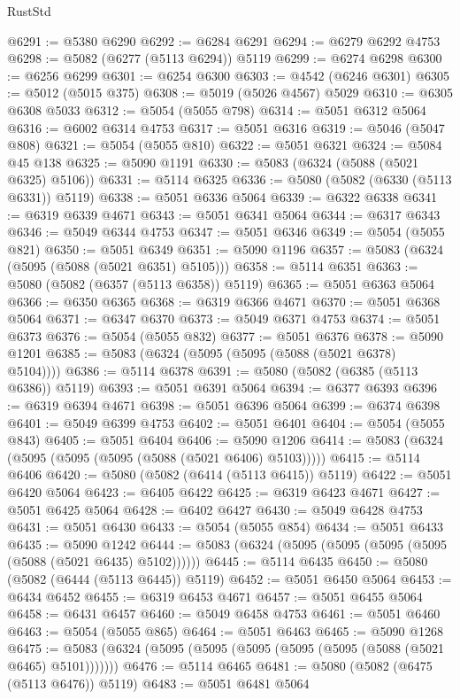 \begin{lexlean}{RustStd}
\begin{coremodule}
@6291 := @5380 @6290
@6292 := @6284 @6291
@6294 := @6279 @6292 @4753
@6298 := @5082 (@6277 (@5113 @6294)) @5119
@6299 := @6274 @6298
@6300 := @6256 @6299
@6301 := @6254 @6300
@6303 := @4542 (@6246 @6301)
@6305 := @5012 (@5015 @375)
@6308 := @5019 (@5026 @4567) @5029
@6310 := @6305 @6308 @5033
@6312 := @5054 (@5055 @798)
@6314 := @5051 @6312 @5064
@6316 := @6002 @6314 @4753
@6317 := @5051 @6316
@6319 := @5046 (@5047 @808)
@6321 := @5054 (@5055 @810)
@6322 := @5051 @6321
@6324 := @5084 @45 @138
@6325 := @5090 @1191
@6330 := @5083 (@6324 (@5088 (@5021 @6325) @5106))
@6331 := @5114 @6325
@6336 := @5080 (@5082 (@6330 (@5113 @6331)) @5119)
@6338 := @5051 @6336 @5064
@6339 := @6322 @6338
@6341 := @6319 @6339 @4671
@6343 := @5051 @6341 @5064
@6344 := @6317 @6343
@6346 := @5049 @6344 @4753
@6347 := @5051 @6346
@6349 := @5054 (@5055 @821)
@6350 := @5051 @6349
@6351 := @5090 @1196
@6357 := @5083 (@6324 (@5095 (@5088 (@5021 @6351) @5105)))
@6358 := @5114 @6351
@6363 := @5080 (@5082 (@6357 (@5113 @6358)) @5119)
@6365 := @5051 @6363 @5064
@6366 := @6350 @6365
@6368 := @6319 @6366 @4671
@6370 := @5051 @6368 @5064
@6371 := @6347 @6370
@6373 := @5049 @6371 @4753
@6374 := @5051 @6373
@6376 := @5054 (@5055 @832)
@6377 := @5051 @6376
@6378 := @5090 @1201
@6385 := @5083 (@6324 (@5095 (@5095 (@5088 (@5021 @6378) @5104))))
@6386 := @5114 @6378
@6391 := @5080 (@5082 (@6385 (@5113 @6386)) @5119)
@6393 := @5051 @6391 @5064
@6394 := @6377 @6393
@6396 := @6319 @6394 @4671
@6398 := @5051 @6396 @5064
@6399 := @6374 @6398
@6401 := @5049 @6399 @4753
@6402 := @5051 @6401
@6404 := @5054 (@5055 @843)
@6405 := @5051 @6404
@6406 := @5090 @1206
@6414 := @5083 (@6324 (@5095 (@5095 (@5095 (@5088 (@5021 @6406) @5103)))))
@6415 := @5114 @6406
@6420 := @5080 (@5082 (@6414 (@5113 @6415)) @5119)
@6422 := @5051 @6420 @5064
@6423 := @6405 @6422
@6425 := @6319 @6423 @4671
@6427 := @5051 @6425 @5064
@6428 := @6402 @6427
@6430 := @5049 @6428 @4753
@6431 := @5051 @6430
@6433 := @5054 (@5055 @854)
@6434 := @5051 @6433
@6435 := @5090 @1242
@6444 := @5083 (@6324 (@5095 (@5095 (@5095 (@5095 (@5088 (@5021 @6435) @5102))))))
@6445 := @5114 @6435
@6450 := @5080 (@5082 (@6444 (@5113 @6445)) @5119)
@6452 := @5051 @6450 @5064
@6453 := @6434 @6452
@6455 := @6319 @6453 @4671
@6457 := @5051 @6455 @5064
@6458 := @6431 @6457
@6460 := @5049 @6458 @4753
@6461 := @5051 @6460
@6463 := @5054 (@5055 @865)
@6464 := @5051 @6463
@6465 := @5090 @1268
@6475 := @5083 (@6324 (@5095 (@5095 (@5095 (@5095 (@5095 (@5088 (@5021 @6465) @5101)))))))
@6476 := @5114 @6465
@6481 := @5080 (@5082 (@6475 (@5113 @6476)) @5119)
@6483 := @5051 @6481 @5064

\end{coremodule}
\end{lexlean}
